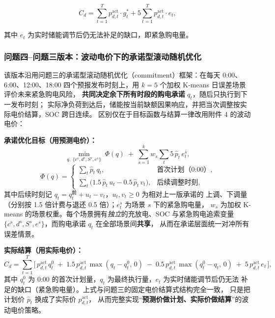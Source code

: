 \documentclass[12pt,a4paper]{article}
\begin{document}
\begin{equation}
    C_d = \sum_{t=1}^{T} p_{d,t}^{\text{act}} \cdot g_t^{*}
        + 5 \sum_{t=1}^{T} p_{d,t}^{\text{act}} \cdot e_t,
\end{equation}

其中 $e_t$ 为实时储能调节后仍无法补足的缺口，即紧急购电量。

\subsubsection{问题四--问题三版本：波动电价下的承诺型滚动随机优化}

该版本沿用问题三的承诺型滚动随机优化（commitment）框架：在每天 0:00、6:00、12:00、18:00
四个预报发布时刻上，用 $k=5$ 个加权 K-means 日误差场景评价未来紧急购电风险，
\textbf{共同决定余下所有时段的购电承诺} $q_t$，随后只执行到下一发布时刻；
实际净负荷到达后，储能按当前缺额因果响应，并把当次调整按实际电价结算，SOC 跨日连续。
区别仅在于目标函数与结算一律改用附件 4 的波动电价：

\textbf{承诺优化目标（用预测电价）：}
\begin{equation}
    \min_{q,\;\{c^s, d^s, S^s, e^s\}}
    \; \Phi(q) \;+\; \sum_{s=1}^{k} w_s \sum_{t} 5\,\hat{p}_t \, e_t^{s},
\end{equation}
\begin{equation}
    \Phi(q) =
    \begin{cases}
        \displaystyle \sum_{t} \hat{p}_t \, q_t, & \text{首次计划（0:00）}, \\[6pt]
        \displaystyle \sum_{t} \big( 1.5\,\hat{p}_t \, u_t - 0.5\,\hat{p}_t \, v_t \big), & \text{后续调整时刻},
    \end{cases}
\end{equation}
其中后续时刻记 $q_t = q_t^{\text{前}} + u_t - v_t$，$u_t, v_t \geq 0$ 为相对上一版承诺的
上调、下调量（分别按 1.5 倍计费与退还 0.5 倍）；$e_t^{s}$ 为场景 $s$ 下的紧急购电量，
$w_s$ 为加权 K-means 的场景权重。每个场景拥有\emph{独立}的充放电、SOC 与紧急购电追索变量
$\{c^s, d^s, S^s, e^s\}$，而购电承诺 $q_t$ 在全部场景间\textbf{共享}，
从而在承诺层面统一对冲所有误差情景。

\textbf{实际结算（用实际电价）：}
\begin{equation}
    C_d = \sum_{t=1}^{T}
    \Big[\, p_{d,t}^{\text{act}} \, q_t^{0}
        \;+\; 1.5\, p_{d,t}^{\text{act}} \, \max(q_t - q_t^{0},\, 0)
        \;-\; 0.5\, p_{d,t}^{\text{act}} \, \max(q_t^{0} - q_t,\, 0)
        \;+\; 5\, p_{d,t}^{\text{act}} \, e_t \,\Big],
\end{equation}
其中 $q_t^{0}$ 为 0:00 的首次计划量，$q_t$ 为最终执行量，$e_t$ 为实时储能调节后仍无法
补足的缺口（紧急购电量）。上式与问题三的固定电价结算式结构完全一致，
只是把计划价 $\hat{p}_t$ 换成了实际价 $p^{\text{act}}_{d,t}$，
从而完整实现“\textbf{预测价做计划、实际价做结算}”的波动电价策略。
\end{document}
